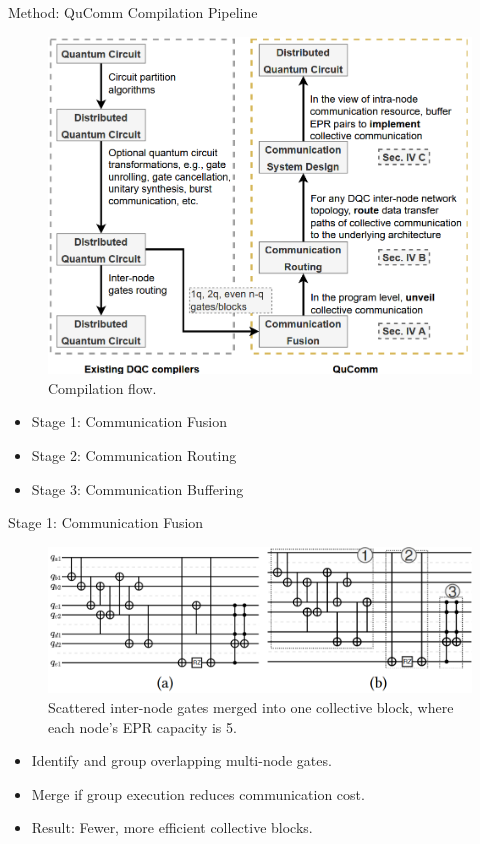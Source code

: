 \documentclass{beamer}
\begin{document}
	
	\begin{frame}{Method: QuComm Compilation Pipeline}
		\begin{figure}
			\includegraphics[width=.5\textwidth]{figure/method.png}
			\caption[]{Compilation flow.}
		\end{figure}
		\begin{itemize}
			\item Stage 1: Communication Fusion
			\item Stage 2: Communication Routing
			\item Stage 3: Communication Buffering
		\end{itemize}
	\end{frame}
	
	\begin{frame}{Stage 1: Communication Fusion}
		\begin{figure}
			\includegraphics[height=20ex]{figure/step1.png}
			\caption[]{Scattered inter-node gates merged into one collective block, where each node’s EPR capacity is 5.}
		\end{figure}
		\begin{itemize}
			\item Identify and group overlapping multi-node gates.
			\item Merge if group execution reduces communication cost.
			\item Result: Fewer, more efficient collective blocks.
		\end{itemize}
	\end{frame}
	
\end{document}
